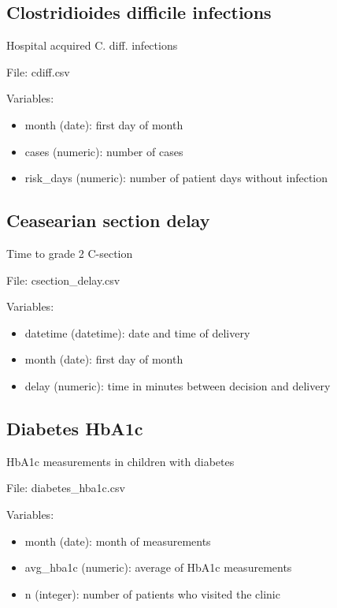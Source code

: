\documentclass[
]{book}
\providecommand{\tightlist}{%
  \setlength{\itemsep}{0pt}\setlength{\parskip}{0pt}}
\begin{document}
\subsection*{Clostridioides difficile
infections}\label{clostridioides-difficile-infections}

Hospital acquired C. diff. infections

File: cdiff.csv

Variables:

\begin{itemize}
\tightlist
\item
  month (date): first day of month
\item
  cases (numeric): number of cases
\item
  risk\_days (numeric): number of patient days without infection
\end{itemize}

\subsection*{Ceasearian section delay}\label{ceasearian-section-delay}

Time to grade 2 C-section

File: csection\_delay.csv

Variables:

\begin{itemize}
\tightlist
\item
  datetime (datetime): date and time of delivery
\item
  month (date): first day of month
\item
  delay (numeric): time in minutes between decision and delivery
\end{itemize}

\subsection*{Diabetes HbA1c}\label{diabetes-hba1c}

HbA1c measurements in children with diabetes

File: diabetes\_hba1c.csv

Variables:

\begin{itemize}
\tightlist
\item
  month (date): month of measurements
\item
  avg\_hba1c (numeric): average of HbA1c measurements
\item
  n (integer): number of patients who visited the clinic
\end{itemize}
\end{document}
